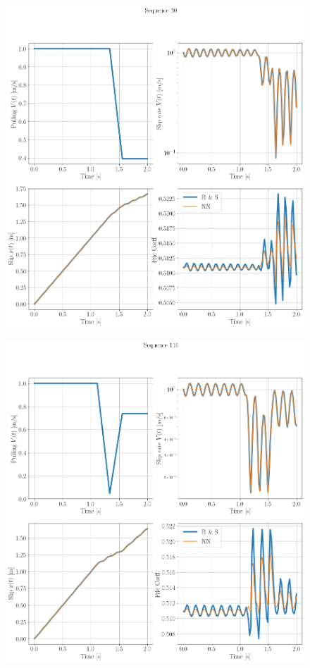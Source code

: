 \begin{figure}[H]
    \centering
    \includegraphics[width=1.0\textwidth]{images/SpringSlider30.png}
\end{figure}
\begin{figure}[H]
    \centering
    \includegraphics[width=1.0\textwidth]{images/SpringSlider116.png}
\end{figure}
